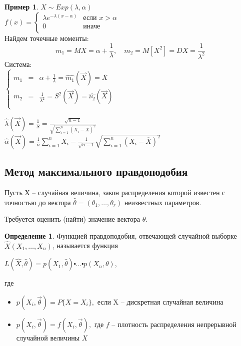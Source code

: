 \documentclass[a4paper, 12pt]{article}
\theoremstyle{definition}
\newtheorem{definition}{Определение}[section]
\theoremstyle{leads}
\theoremstyle{example}
\newtheorem{example}{Пример}
\begin{document}
\begin{example}
	$X \sim Exp(\lambda, \alpha)$\\
	$f(x) = 
	\begin{cases}
	\lambda e^{-\lambda(x - \alpha)} & \text{если  $x > \alpha$}\\
	0 & \text{иначе}\\
	\end{cases}$\\
	Найдем точечные моменты: 
	\begin{displaymath}
		m_1 = MX = \alpha + \frac{1}{\lambda}, \quad m_2 = M[X^2] = DX = \frac{1}{\lambda^2}
	\end{displaymath}
	Система:\\
	 $\left \{
\begin{array}{ccc}
m_1 & = &\alpha + \frac{1}{\lambda} = \hat{m_1}(\vec{X}) = \overline{X} \\
m_2 &= &\frac{1}{\lambda^2} = S^2(\vec{X}) = \hat{\nu_2}(\vec{X}) \\
\end{array}
\right.$

$\hat{\lambda}(\vec{X}) = \frac{1}{S} = \frac{\sqrt{n - 1}}{\sqrt{\sum_{i=1}^{n}(X_i - \overline{X})^2}}$\\
$\hat{\alpha}(\vec{X}) = \frac{1}{n}\sum_{i=1}^{n}X_i - \frac{1}{\sqrt{n - 1}}\sqrt{\sum_{i=1}^{n}(X_i - \overline{X})^2}$
\end{example}
\subsection{Метод максимального правдоподобия}
Пусть Х -- случайная величина, закон распределения которой известен с точностью до вектора $\hat{\theta} = (\theta_1, \dots, \theta_r)$ неизвестных параметров.

Требуется оценить (найти) значение вектора $\theta$.

\begin{definition}
	Функцией правдоподобия, отвечающей случайной выборке $\hat{X}(X_1, \dots, X_n)$, называется функция
	\begin{center}
		\centering
		$L(\hat{X}, \hat{\theta}) = p(X_1, \hat{\theta}) \centerdot\dots \centerdot p(X_n, \theta)$, 
	\end{center}
где 
\begin{itemize}
	\item $p(X_i, \vec{\theta}) = P\{X = X_i\},$ если X -- дискретная случайная величина
	\item $p(X_i, \vec{\theta}) = f(X_i, \vec{\theta}), $ где $f$ -- плотность распределения непрерывной случайной величины $X$
\end{itemize}

\end{definition}
\end{document}

